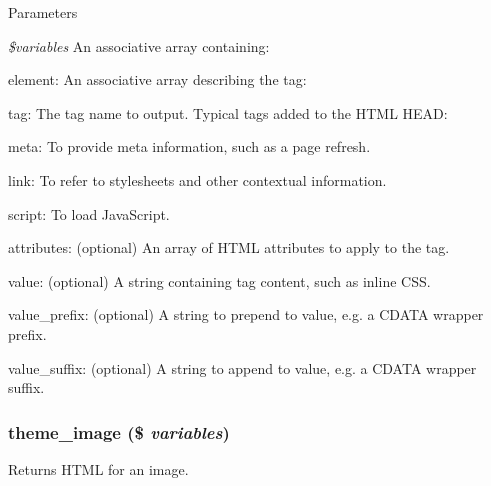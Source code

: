 \begin{DoxyParams}{Parameters}
\item[{\em \$variables}]An associative array containing:
\begin{DoxyItemize}
\item element: An associative array describing the tag:
\begin{DoxyItemize}
\item tag: The tag name to output. Typical tags added to the HTML HEAD:
\begin{DoxyItemize}
\item meta: To provide meta information, such as a page refresh.
\item link: To refer to stylesheets and other contextual information.
\item script: To load JavaScript.
\end{DoxyItemize}
\item attributes: (optional) An array of HTML attributes to apply to the tag.
\item value: (optional) A string containing tag content, such as inline CSS.
\item value\_\-prefix: (optional) A string to prepend to value, e.g. a CDATA wrapper prefix.
\item value\_\-suffix: (optional) A string to append to value, e.g. a CDATA wrapper suffix. 
\end{DoxyItemize}
\end{DoxyItemize}\end{DoxyParams}
\hypertarget{group__themeable_gae97e7e2541a9eb4e69e72b6945fec32c}{
\subsubsection[{theme\_\-image}]{\setlength{\rightskip}{0pt plus 5cm}theme\_\-image (\$ {\em variables})}}
\label{group__themeable_gae97e7e2541a9eb4e69e72b6945fec32c}
Returns HTML for an image.


